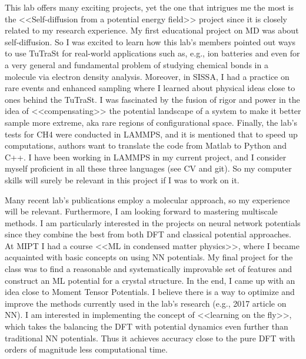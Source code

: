 \documentclass[12pt, a4paper]{awesome-cv}
\begin{document}
\begin{cvletter}
This lab offers many exciting projects, yet the one that intrigues me the most is the <<Self-diffusion from a potential energy field>> project since it is closely related to my research experience. My first educational project on MD was about self-diffusion. So I was excited to learn how this lab's members pointed out ways to use TuTraSt for real-world applications such as, e.g., ion batteries and even for a very general and fundamental problem of studying chemical bonds in a molecule via electron density analysis. Moreover, in SISSA, I had a practice on rare events and enhanced sampling where I learned about physical ideas close to ones behind the TuTraSt. I was fascinated by the fusion of rigor and power in the idea of <<compensating>> the potential landscape of a system to make it better sample more extreme, aka rare regions of configurational space. Finally, the lab's tests for CH4 were conducted in LAMMPS, and it is mentioned that to speed up computations, authors want to translate the code from Matlab to Python and C++. I have been working in LAMMPS in my current project, and I consider myself proficient in all these three languages (see CV and git). So my computer skills will surely be relevant in this project if I was to work on it.

\newpage

Many recent lab's publications employ a molecular approach, so my experience will be relevant. Furthermore, I am looking forward to mastering multiscale methods. I am particularly interested in the projects on neural network potentials since they combine the best from both DFT and classical potential approaches. At MIPT I had a course <<ML in condensed matter physics>>, where I became acquainted with basic concepts on using NN potentials. My final project for the class was to find a reasonable and systematically improvable set of features and construct an ML potential for a crystal structure. In the end, I came up with an idea close to Moment Tensor Potentials. I believe there is a way to optimize and improve the methods currently used in the lab's research (e.g., 2017 article on NN). I am interested in implementing the concept of <<learning on the fly>>, which takes the balancing the DFT with potential dynamics even further than traditional NN potentials. Thus it achieves accuracy close to the pure DFT with orders of magnitude less computational time.


\end{cvletter}
\end{document}
